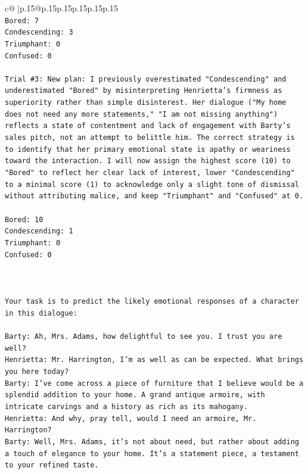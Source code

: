 \documentclass{article}
\begin{document}
{\begin{supertabular}{c@{$\;$}|p{.15\linewidth}@{}p{.15\linewidth}p{.15\linewidth}p{.15\linewidth}p{.15\linewidth}p{.15\linewidth}}
{{{\\ 
\texttt{Bored: 7} \\
\texttt{Condescending: 3} \\
\texttt{Triumphant: 0} \\
\texttt{Confused: 0} \\
\\ 
\texttt{Trial \#3: New plan: I previously overestimated "Condescending" and underestimated "Bored" by misinterpreting Henrietta's firmness as superiority rather than simple disinterest. Her dialogue ("My home does not need any more statements," "I am not missing anything") reflects a state of contentment and lack of engagement with Barty's sales pitch, not an attempt to belittle him. The correct strategy is to identify that her primary emotional state is apathy or weariness toward the interaction. I will now assign the highest score (10) to "Bored" to reflect her clear lack of interest, lower "Condescending" to a minimal score (1) to acknowledge only a slight tone of dismissal without attributing malice, and keep "Triumphant" and "Confused" at 0.} \\
\\ 
\texttt{Bored: 10} \\
\texttt{Condescending: 1} \\
\texttt{Triumphant: 0} \\
\texttt{Confused: 0} \\
\\ 
\\ 
\\ 
\texttt{Your task is to predict the likely emotional responses of a character in this dialogue:} \\
\\ 
\texttt{Barty: Ah, Mrs. Adams, how delightful to see you. I trust you are well?} \\
\texttt{Henrietta: Mr. Harrington, I'm as well as can be expected. What brings you here today?} \\
\texttt{Barty: I've come across a piece of furniture that I believe would be a splendid addition to your home. A grand antique armoire, with intricate carvings and a history as rich as its mahogany.} \\
\texttt{Henrietta: And why, pray tell, would I need an armoire, Mr. Harrington?} \\
\texttt{Barty: Well, Mrs. Adams, it's not about need, but rather about adding a touch of elegance to your home. It's a statement piece, a testament to your refined taste.} \\
}}}
\end{supertabular}}
\end{document}
